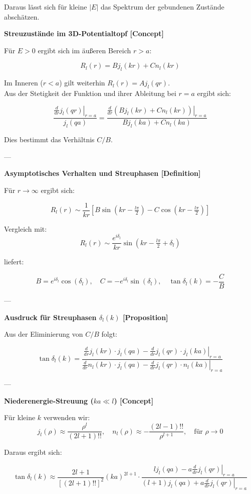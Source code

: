 \documentclass[10pt, letterpaper]{article}
\begin{document}
Daraus lässt sich für kleine $|E|$ das Spektrum der gebundenen Zustände abschätzen.


\textbf{Streuzustände im 3D-Potentialtopf [Concept]}

Für $E > 0$ ergibt sich im äußeren Bereich $r > a$:

\[
R_l(r) = B j_l(kr) + C n_l(kr)
\]

Im Inneren ($r < a$) gilt weiterhin $R_l(r) = A j_l(qr)$.\\
Aus der Stetigkeit der Funktion und ihrer Ableitung bei $r = a$ ergibt sich:

\[
\frac{\left. \frac{d}{dr} j_l(qr) \right|_{r=a}}{j_l(qa)} =
\frac{\left. \frac{d}{dr} (B j_l(kr) + C n_l(kr)) \right|_{r=a}}{B j_l(ka) + C n_l(ka)}
\]

Dies bestimmt das Verhältnis $C/B$.

---

\textbf{Asymptotisches Verhalten und Streuphasen [Definition]}

Für $r \rightarrow \infty$ ergibt sich:

\[
R_l(r) \sim \frac{1}{kr} \left[
B \sin(kr - \tfrac{l\pi}{2}) - C \cos(kr - \tfrac{l\pi}{2})
\right]
\]

Vergleich mit:
\[
R_l(r) \sim \frac{e^{i\delta_l}}{kr} \sin(kr - \tfrac{l\pi}{2} + \delta_l)
\]

liefert:

\[
B = e^{i\delta_l} \cos(\delta_l), \quad
C = -e^{i\delta_l} \sin(\delta_l), \quad
\tan \delta_l(k) = -\frac{C}{B}
\]

---

\textbf{Ausdruck für Streuphasen $\delta_l(k)$ [Proposition]}

Aus der Eliminierung von $C/B$ folgt:

\[
\tan \delta_l(k) =
\frac{ \left. \frac{d}{dr} j_l(kr) \cdot j_l(qa) - \frac{d}{dr} j_l(qr) \cdot j_l(ka) \right|_{r=a} }
     { \left. \frac{d}{dr} n_l(kr) \cdot j_l(qa) - \frac{d}{dr} j_l(qr) \cdot n_l(ka) \right|_{r=a} }
\]

---

\textbf{Niederenergie-Streuung ($ka \ll l$) [Concept]}

Für kleine $k$ verwenden wir:
\[
j_l(\rho) \approx \frac{\rho^l}{(2l+1)!!}, \quad
n_l(\rho) \approx -\frac{(2l-1)!!}{\rho^{l+1}}, \quad \text{für } \rho \to 0
\]

Daraus ergibt sich:

\[
\tan \delta_l(k) \approx \frac{2l+1}{[(2l+1)!!]^2} (ka)^{2l+1} \cdot
\frac{l j_l(qa) - a \left. \frac{d}{dr} j_l(qr) \right|_{r=a}}{(l+1) j_l(qa) + a \left. \frac{d}{dr} j_l(qr) \right|_{r=a}}
\]
\end{document}
